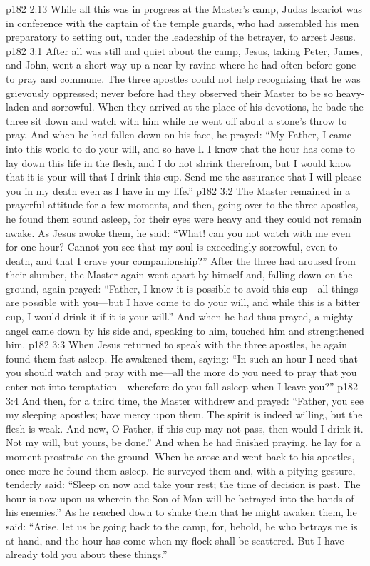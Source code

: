 \pc \vs p182 2:13 While all this was in progress at the Master’s camp, Judas Iscariot was in conference with the captain of the temple guards, who had assembled his men preparatory to setting out, under the leadership of the betrayer, to arrest Jesus.
\vs p182 3:1 After all was still and quiet about the camp, Jesus, taking Peter, James, and John, went a short way up a near\hyp{}by ravine where he had often before gone to pray and commune. The three apostles could not help recognizing that he was grievously oppressed; never before had they observed their Master to be so heavy\hyp{}laden and sorrowful. When they arrived at the place of his devotions, he bade the three sit down and watch with him while he went off about a stone’s throw to pray. And when he had fallen down on his face, he prayed: \textcolor{ubdarkred}{“My Father, I came into this world to do your will, and so have I. I know that the hour has come to lay down this life in the flesh, and I do not shrink therefrom, but I would know that it is your will that I drink this cup. Send me the assurance that I will please you in my death even as I have in my life.”}
\vs p182 3:2 The Master remained in a prayerful attitude for a few moments, and then, going over to the three apostles, he found them sound asleep, for their eyes were heavy and they could not remain awake. As Jesus awoke them, he said: \textcolor{ubdarkred}{“What! can you not watch with me even for one hour? Cannot you see that my soul is exceedingly sorrowful, even to death, and that I crave your companionship?”} After the three had aroused from their slumber, the Master again went apart by himself and, falling down on the ground, again prayed: \textcolor{ubdarkred}{“Father, I know it is possible to avoid this cup---all things are possible with you---but I have come to do your will, and while this is a bitter cup, I would drink it if it is your will.”} And when he had thus prayed, a mighty angel came down by his side and, speaking to him, touched him and strengthened him.
\vs p182 3:3 When Jesus returned to speak with the three apostles, he again found them fast asleep. He awakened them, saying: \textcolor{ubdarkred}{“In such an hour I need that you should watch and pray with me---all the more do you need to pray that you enter not into temptation---wherefore do you fall asleep when I leave you?”}
\vs p182 3:4 And then, for a third time, the Master withdrew and prayed: \textcolor{ubdarkred}{“Father, you see my sleeping apostles; have mercy upon them. The spirit is indeed willing, but the flesh is weak. And now, O Father, if this cup may not pass, then would I drink it. Not my will, but yours, be done.”} And when he had finished praying, he lay for a moment prostrate on the ground. When he arose and went back to his apostles, once more he found them asleep. He surveyed them and, with a pitying gesture, tenderly said: \textcolor{ubdarkred}{“Sleep on now and take your rest; the time of decision is past. The hour is now upon us wherein the Son of Man will be betrayed into the hands of his enemies.”} As he reached down to shake them that he might awaken them, he said: \textcolor{ubdarkred}{“Arise, let us be going back to the camp, for, behold, he who betrays me is at hand, and the hour has come when my flock shall be scattered. But I have already told you about these things.”}
